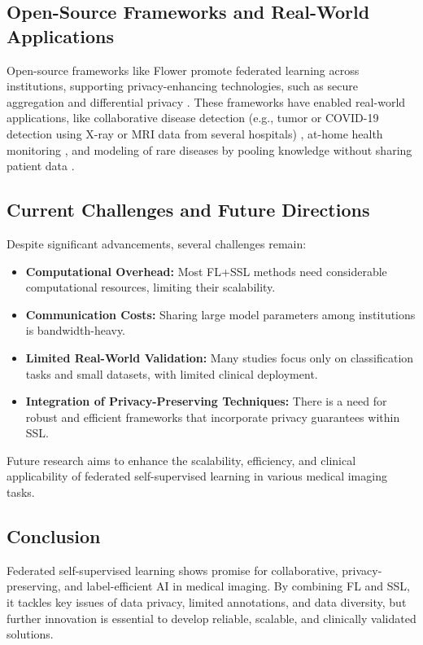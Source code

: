 \documentclass[a4paper, 10 pt, conference]{ieeeconf}
\begin{document}
\subsection{Open-Source Frameworks and Real-World Applications}

Open-source frameworks like Flower \cite{Flower} promote federated learning across institutions, supporting privacy-enhancing technologies, such as secure aggregation \cite{Bonawitz2017} and differential privacy \cite{Dwork2014}. These frameworks have enabled real-world applications, like collaborative disease detection (e.g., tumor or COVID-19 detection using X-ray or MRI data from several hospitals) \cite{Kumar2020}, at-home health monitoring \cite{Chen2020}, and modeling of rare diseases by pooling knowledge without sharing patient data \cite{Sheller2020}.

\subsection{Current Challenges and Future Directions}

Despite significant advancements, several challenges remain:

\begin{itemize}
    \item \textbf{Computational Overhead:} Most FL+SSL methods need considerable computational resources, limiting their scalability.
    \item \textbf{Communication Costs:} Sharing large model parameters among institutions is bandwidth-heavy.
    \item \textbf{Limited Real-World Validation:} Many studies focus only on classification tasks and small datasets, with limited clinical deployment.
    \item \textbf{Integration of Privacy-Preserving Techniques:} There is a need for robust and efficient frameworks that incorporate privacy guarantees within SSL.
\end{itemize}

Future research aims to enhance the scalability, efficiency, and clinical applicability of federated self-supervised learning in various medical imaging tasks.

\subsection{Conclusion}

Federated self-supervised learning shows promise for collaborative, privacy-preserving, and label-efficient AI in medical imaging. By combining FL and SSL, it tackles key issues of data privacy, limited annotations, and data diversity, but further innovation is essential to develop reliable, scalable, and clinically validated solutions.
\end{document}

